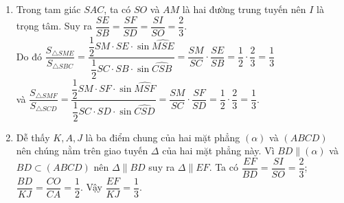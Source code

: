 \begin{bt}
\begin{bt}
{\begin{enumerate}
			Giao tuyến này cắt $SB$ tại $E$, cắt $SD$ tại $F$.
			\item Trong tam giác $SAC$, ta có $SO$ và $AM$ là hai đường trung tuyến nên $I$ là trọng tâm. Suy ra $\dfrac{SE}{SB}=\dfrac{SF}{SD}=\dfrac{SI}{SO}=\dfrac{2}{3}$. \\
			Do đó $\dfrac{S_{\triangle SME}}{S_{\triangle SBC}}=\dfrac{\dfrac{1}{2}SM\cdot SE\cdot \sin \widehat{MSE}}{\dfrac{1}{2}SC\cdot SB\cdot \sin \widehat{CSB}}=\dfrac{SM}{SC}\cdot \dfrac{SE}{SB}=\dfrac{1}{2}\cdot \dfrac{2}{3}=\dfrac{1}{3}$\\
			và $\dfrac{S_{\triangle SMF}}{S_{\triangle SCD}}=\dfrac{\dfrac{1}{2}SM\cdot SF\cdot \sin \widehat{MSF}}{\dfrac{1}{2}SC\cdot SD\cdot \sin \widehat{CSD}}=\dfrac{SM}{SC}\cdot \dfrac{SF}{SD}=\dfrac{1}{2}\cdot \dfrac{2}{3}=\dfrac{1}{3}$.
			\item Dễ thấy $K,A,J$ là ba điểm chung của hai mặt phẳng $\left(\alpha \right)$ và $(ABCD)$ nên chúng nằm trên giao tuyến $ \Delta $ của hai mặt phẳng này. Vì $BD\parallel \left(\alpha \right)$ và $BD\subset (ABCD)$ nên $ \Delta \parallel BD$ suy ra $ \Delta \parallel EF$. Ta có $\dfrac{EF}{BD}=\dfrac{SI}{SO}=\dfrac{2}{3}$; $\dfrac{BD}{KJ}=\dfrac{CO}{CA}=\dfrac{1}{2}$. Vậy $\dfrac{EF}{KJ}=\dfrac{1}{3}$.
		\end{enumerate}
	}
\end{bt}


\end{bt}
